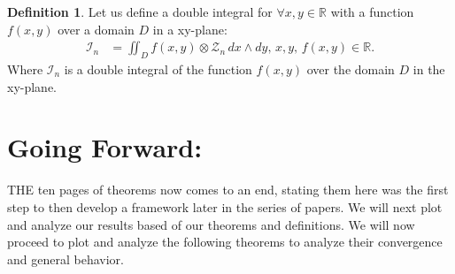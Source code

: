 \documentclass[10pt]{article}
\theoremstyle{plain}
\theoremstyle{definition}
\newtheorem{definition}[theorem]{Definition}
\theoremstyle{remark}
\begin{document}
\begin{definition}
	Let us define a double integral for $\forall x, y \in \mathbb{R}$ with a function $f(x, y)$ over a domain $D$ in a xy-plane:
	\begin{align*}
		\mathcal{I}_n &= \iint_{D} f(x, y) \otimes \mathcal{Z}_n \, dx \land dy, \, x, y, \, f(x, y) \in \mathbb{R}.
	\end{align*}
	Where $\mathcal{I}_n$ is a double integral of the function $f(x, y)$ over the domain $D$ in the xy-plane.
\end{definition}

\section{Going Forward:}

\lettrine[lines=2, lhang=0.1, loversize=0.2]{T}HE ten pages of theorems now comes to an end, stating them here was the first step to then develop a framework later in the series of papers. We will next plot and analyze our results based of our theorems and definitions. We will now proceed to plot and analyze the following theorems to analyze their convergence and general behavior.

\nocite{*}




\end{document}

